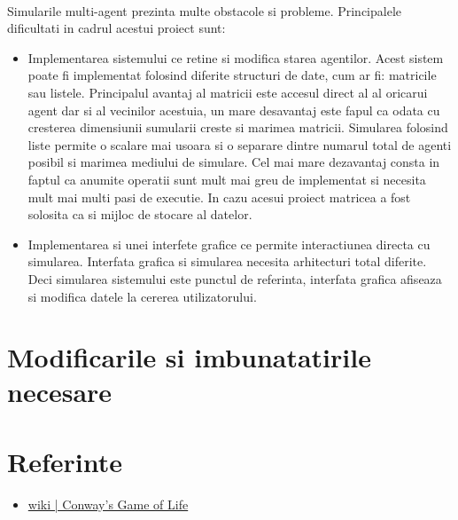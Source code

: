 \documentclass[11pt ,A4]{article}
\begin{document}
        \paragraph{} Simularile multi-agent prezinta multe obstacole si probleme. Principalele dificultati in cadrul acestui proiect sunt:
        \begin{itemize}
            \item Implementarea sistemului ce retine si modifica starea agentilor. Acest sistem poate fi implementat folosind diferite structuri de date, cum ar fi: matricile sau listele. Principalul avantaj al matricii este accesul direct al al oricarui agent dar si al vecinilor acestuia, un mare desavantaj este fapul ca odata cu cresterea dimensiunii sumularii creste si marimea matricii. Simularea folosind liste permite o scalare mai usoara si o separare dintre numarul total de agenti posibil si marimea mediului de simulare. Cel mai mare dezavantaj consta in faptul ca anumite operatii sunt mult mai greu de implementat si necesita mult mai multi pasi de executie. In cazu acesui proiect matricea a fost solosita ca si mijloc de stocare al datelor.

            \item Implementarea si unei interfete grafice ce permite interactiunea directa cu simularea. Interfata grafica si simularea necesita arhitecturi total diferite. Deci simularea sistemului este punctul de referinta, interfata grafica afiseaza si modifica datele la cererea utilizatorului.
        \end{itemize}

    \section{Modificarile si imbunatatirile necesare}

    \section{Referinte}

        \begin{itemize}
            \item \href{https://en.wikipedia.org/wiki/Conway%27s_Game_of_Life}{wiki | Conway's Game of Life}
        \end{itemize}
\end{document}
